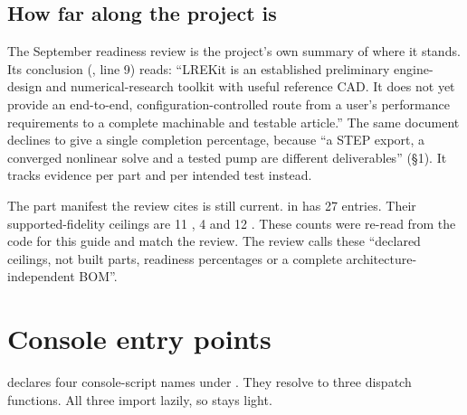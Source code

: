 \subsection{How far along the project is}

The September readiness review is the project's own summary of where it stands. Its conclusion (, line 9) reads: ``LREKit is an established preliminary engine-design and numerical-research toolkit with useful reference CAD. It does not yet provide an end-to-end, configuration-controlled route from a user's performance requirements to a complete machinable and testable article.'' The same document declines to give a single completion percentage, because ``a STEP export, a converged nonlinear solve and a tested pump are different deliverables'' (§1). It tracks evidence per part and per intended test instead.

The part manifest the review cites is still current.  in  has 27 entries. Their supported-fidelity ceilings are 11 , 4  and 12 . These counts were re-read from the code for this guide and match the review. The review calls these ``declared ceilings, not built parts, readiness percentages or a complete architecture-independent BOM''.


\section{Console entry points}\label{sec:orient-entry}

 declares four console-script names under . They resolve to three dispatch functions. All three import lazily, so  stays light.

